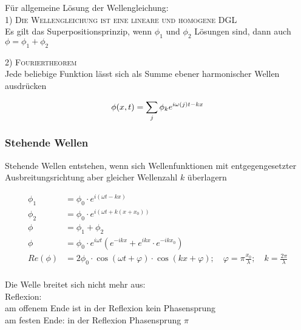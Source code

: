 \documentclass[a4paper,12pt]{report}
\begin{document}
Für allgemeine Lösung der Wellengleichung: \\



\textsc{1) Die Wellengleichung ist eine lineare und homogene DGL} \\
		
\quad Es gilt das Superpositionsprinzip, wenn $\phi_1$  und $\phi_2$  Lösungen sind, dann auch \\
\quad$\phi=\phi_1+\phi_2$
			
\textsc{2) Fouriertheorem}\\

Jede beliebige Funktion lässt sich als Summe ebener harmonischer Wellen ausdrücken


\begin{equation*}
\phi(x,t) = \sum_j\phi_k e^{i\omega(j)t-kx} \\
\end{equation*}

\subsubsection{Stehende Wellen}

Stehende Wellen entstehen, wenn sich Wellenfunktionen mit entgegengesetzter Ausbreitungsrichtung aber gleicher Wellenzahl $ k $ überlagern

\begin{align*}
\phi_1 &= \phi_0 \cdot e^{i(\omega t-kx)} \\
\phi_2 &= \phi_0 \cdot e^{i(\omega t + k(x+x_0))} \\
\phi &= \phi_1 + \phi_2 \\
\phi &= \phi_0 \cdot e^{i\omega t}(e^{-ikx}+e^{ikx}\cdot e^{-ikx_0}) \\
Re(\phi) &= 2 \phi_0 \cdot \cos(\omega t+\varphi) \cdot \cos(kx + \varphi); \quad \varphi = \pi \frac{x_0}{\lambda}; \quad k = \frac{2\pi}{\lambda} \\
\end{align*}

Die Welle breitet sich nicht mehr aus: \\

Reflexion: \\

\quad am offenem Ende ist in der Reflexion kein Phasensprung \\

\quad am festen Ende: in der Reflexion Phasensprung $\pi$ \\
\end{document}
